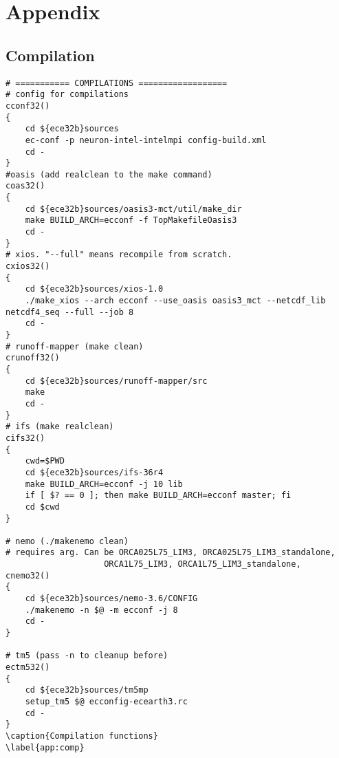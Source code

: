 \chapter{Appendix}
\section{Compilation}

\begin{lstlisting}
# =========== COMPILATIONS ==================
# config for compilations
cconf32()
{
    cd ${ece32b}sources
    ec-conf -p neuron-intel-intelmpi config-build.xml
    cd -
}
#oasis (add realclean to the make command)
coas32()
{
    cd ${ece32b}sources/oasis3-mct/util/make_dir
    make BUILD_ARCH=ecconf -f TopMakefileOasis3
    cd -
}
# xios. "--full" means recompile from scratch.
cxios32()
{
    cd ${ece32b}sources/xios-1.0
    ./make_xios --arch ecconf --use_oasis oasis3_mct --netcdf_lib netcdf4_seq --full --job 8
    cd -
}
# runoff-mapper (make clean)
crunoff32()
{
    cd ${ece32b}sources/runoff-mapper/src
    make
    cd -
}
# ifs (make realclean)
cifs32()
{
    cwd=$PWD 
    cd ${ece32b}sources/ifs-36r4
    make BUILD_ARCH=ecconf -j 10 lib
    if [ $? == 0 ]; then make BUILD_ARCH=ecconf master; fi
    cd $cwd
}

# nemo (./makenemo clean)
# requires arg. Can be ORCA025L75_LIM3, ORCA025L75_LIM3_standalone, 
                    ORCA1L75_LIM3, ORCA1L75_LIM3_standalone,
cnemo32()
{
    cd ${ece32b}sources/nemo-3.6/CONFIG
    ./makenemo -n $@ -m ecconf -j 8
    cd -
} 

# tm5 (pass -n to cleanup before)
ectm532()
{
    cd ${ece32b}sources/tm5mp
    setup_tm5 $@ ecconfig-ecearth3.rc
    cd -
}
\caption{Compilation functions}
\label{app:comp}
\end{lstlisting}

